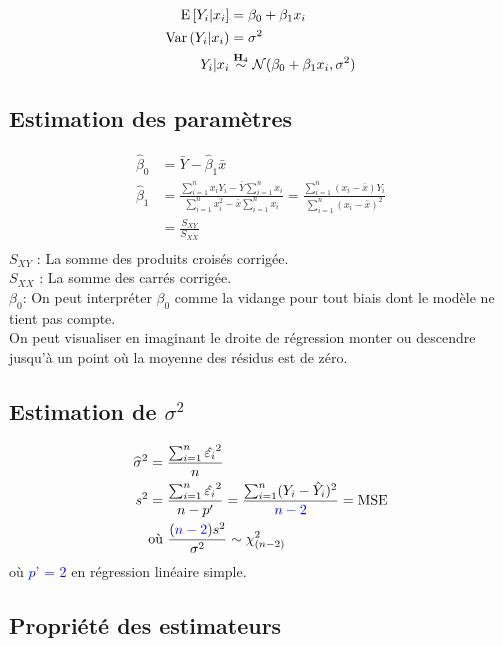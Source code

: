 \documentclass[10pt, french]{article}
\begin{document}
\begin{multicols*}{3}
\begin{align*}
\mathrm{E} \left[ Y_i | x_i \right] 	& = \beta_0 + \beta_1 x_i \\
\mathrm{Var} \left( Y_i | x_i \right)	& = \sigma^2 \\
Y_i | x_i & \overset{\mathbf{H}_4}{\sim} \mathcal{N} (\beta_0 + \beta_1 x_i, \sigma^2) 
\end{align*}

\subsection*{Estimation des paramètres}
\begin{align*}
\hat{\beta}_0 	& = \bar{Y} - \hat{\beta}_1 \bar{x} \\
\hat{\beta}_1	& = \frac{\sum_{i=1}^{n} x_i Y_i - \bar{Y} \sum_{i=1}^{n} x_i}{\sum_{i=1}^{n} x_i^2 - \bar{x} \sum_{i=1}^{n} x_i} 
= \frac{\sum_{i=1}^{n}(x_i - \bar{x})Y_i}{\sum_{i = 1}^{n} (x_{i} - \bar{x})^2}\\
&= \frac{S_{XY}}{S_{XX}}\\
\end{align*}
$S_{XY}$ : La somme des produits croisés corrigée.\\
$S_{XX}$ : La somme des carrés corrigée. \\
$\beta_0$: On peut interpréter $\beta_0$ comme la vidange pour tout biais dont le modèle ne tient pas compte. \\ On peut visualiser en imaginant le droite de régression monter ou descendre jusqu'à un point où la moyenne des résidus est de zéro.

\subsection*{Estimation de $\sigma^2$}
\begin{align*}
\widehat{\sigma}^2 &= \frac{\sum_{i=1}^{n} \hat{\varepsilon_i}^2}{n} \\
s^2 &= \frac{\sum_{i=1}^{n} \hat{\varepsilon_i}^2}{n-p'} = \frac{\sum_{i=1}^{n} (Y_i - \hat{Y}_i)^2}{\textcolor{blue}{n-2}} = \text{MSE} \\
&\text{où } \frac{(\textcolor{blue}{n-2})s^{2}}{\sigma^{2}} \sim \chi^{2}_{(n - 2)} 
\end{align*}
où \textcolor{blue}{$p$' = 2} en régression linéaire simple.

\subsection*{Propriété des estimateurs}
\begin{tabular}{|L | C | C | C | C| }
\hline
{}  &  &  \\\hline


\end{tabular}
\end{multicols*}
\end{document}
